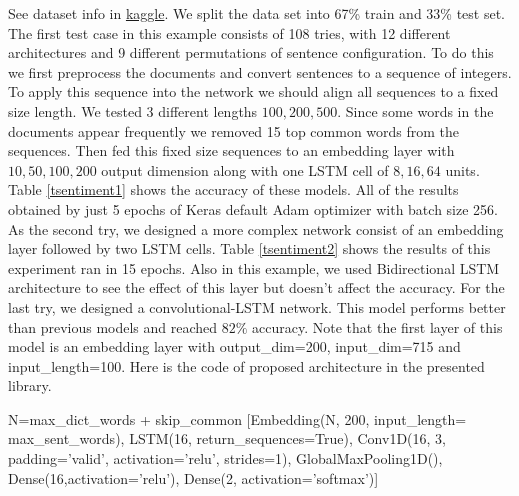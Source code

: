 \documentclass[10pt]{SelfArx} %
\begin{document}
	See dataset info in \href{https://www.kaggle.com/ashukr/rnnsentiment-data}{kaggle}. We split the data set into 67\% train and 33\% test set. The first test case in this example consists of 108 tries, with 12 different architectures and 9 different permutations of sentence configuration. To do this we first preprocess the documents and convert sentences to a sequence of integers. To apply this sequence into the network we should align all sequences to a fixed size length. We tested 3 different lengths $100,200,500$. Since some words in the documents appear frequently we removed 15 top common words from the sequences. Then fed this fixed size sequences to an embedding layer with $10,50,100,200$ output dimension along with one LSTM cell of $8,16,64$ units. Table \ref{tsentiment1} shows the accuracy of these models. All of the results obtained by just 5 epochs of Keras default Adam optimizer with batch size 256.  As the second try, we designed a more complex network consist of an embedding layer followed by two LSTM cells. Table \ref{tsentiment2} shows the results of this experiment ran in 15 epochs. Also in this example, we used Bidirectional LSTM architecture to see the effect of this layer but doesn't affect the accuracy.  For the last try, we designed a convolutional-LSTM network. This model performs better than previous models and reached $82\%$ accuracy. Note that the first layer of this model is an embedding layer with output\_dim=200, input\_dim=715 and input\_length=100. Here is the code of proposed architecture in the presented library.
	\begin{python}
N=max_dict_words + skip_common
[Embedding(N, 200, input_length=
max_sent_words), 
LSTM(16, return_sequences=True),
Conv1D(16, 3, padding='valid',
activation='relu', strides=1),
GlobalMaxPooling1D(),
Dense(16,activation='relu'),
Dense(2, activation='softmax')]
\end{python}
\end{document}
